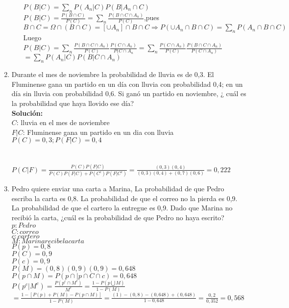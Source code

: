 \documentclass[12pt]{article}
\begin{document}
\begin{enumerate}
\begin{enumerate}
$P(B|C)=\displaystyle \sum_n P(A_n|C)P(B|A_n\cap C)$\\
$P(B|C)=\frac{P(B\cap C)}{P(C)}=\displaystyle \sum_n\frac{P(B\cap C\cap A_n)}{P(C)}$,pues\\
$B\cap C= \Omega \cap (B\cap C)= [\cup A_n]\cap B\cap C \Rightarrow P(\cup A_n\cap B\cap C)=\displaystyle \sum_n P(A_n\cap B\cap C) $\\
Luego\\
$P(B|C)=\displaystyle \sum_n\frac{P(B\cap C\cap A_n)}{P(C)}\frac{P(C\cap A_n)}{P(C\cap A_n}=\displaystyle \sum_n \frac{P(C\cap A_n)}{P(C)}\frac{P(B\cap C\cap A_n)}{P(C\cap A_n)}$\\
$=\displaystyle \sum_n P(A_n|C)P(B|C\cap A_n)$
\end{enumerate}
\item  Durante el mes de noviembre la probabilidad de lluvia es de  0,3. El Fluminense gana un partido en un día con lluvia con probabilidad  0,4; en un día sin lluvia con probabilidad 0,6. Si ganó un partido en noviembre, ¿ cuál es la probabilidad que haya llovido ese día?\\
{\bf Solución:} \\
$C$: lluvia en el mes de noviembre\\
$F|C$: Fluminense gana un partido en un dia con lluvia\\
$P(C)=0,3 ; P(F|C)=0,4$\\
\\
\\
$P(C|F)=\frac{P(C)P(F|C)}{P(C)P(F|C)+P(C^c)P(F|C^c)}=\frac{(0,3)(0,4)}{(0,3)(0,4)+(0,7)(0,6)}=0,222$

\item Pedro quiere enviar una carta a Marina, La probabilidad de que Pedro escriba la carta es 0,8. La probabilidad de que el correo no la pierda es 0,9. La probabilidad de que el cartero  la entregue es 0,9. Dado que Marina no recibió la carta, ¿cuál es la probabilidad de que Pedro no  haya escrito?\\
$p:Pedro$\\
$C:correo$\\
$c:cartero$\\
$M: Marina recibe la carta$\\
$P(p)=0,8$\\
$P(C)=0,9$\\
$P(c)=0,9$\\
$P(M)=(0,8)(0,9)(0,9)=0,648$\\
$P(p\cap M)=P(p\cap|p\cap C\cap c)=0,648$
$P(p^c|M^c)=\frac{P(p^c\cap M^c)}{M^c}=\frac{1-P(p\bigcup M)}{1-P(M)}$
$=\frac{1-[P(p)+P(M)-P(p\cap M)]}{1-P(M)}= \frac{(1)-(0,8)-(0,648)+(0,648)}{1-0,648}=\frac{0,2}{0,352}=0,568$


\end{enumerate}
\end{document}
